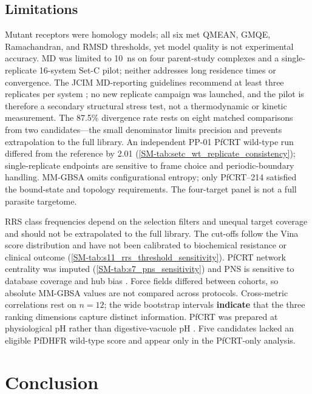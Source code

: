 \documentclass[journal=jcisd8,manuscript=article,layout=traditional]{achemso}
\begin{document}
\subsection{Limitations}

Mutant receptors were homology models; all six met QMEAN, GMQE, Ramachandran, and RMSD thresholds, yet model quality is not experimental accuracy. MD was limited to 10~ns on four parent-study complexes and a single-replicate 16-system Set-C pilot; neither addresses long residence times or convergence. The JCIM MD-reporting guidelines recommend at least three replicates per system \citep{soares2023mdreport}; no new replicate campaign was launched, and the pilot is therefore a secondary structural stress test, not a thermodynamic or kinetic measurement. The 87.5\% divergence rate rests on eight matched comparisons from two candidates---the small denominator limits precision and prevents extrapolation to the full library. An independent PP-01 PfCRT wild-type run differed from the reference by \qty{2.01}{\kcalmol} (\cref{SM-tab:setc_wt_replicate_consistency}); single-replicate endpoints are sensitive to frame choice and periodic-boundary handling. MM-GBSA omits configurational entropy; only PfCRT--214 satisfied the bound-state and topology requirements. The four-target panel is not a full parasite targetome.

RRS class frequencies depend on the selection filters and unequal target coverage and should not be extrapolated to the full library. The cut-offs follow the Vina score distribution and have not been calibrated to biochemical resistance or clinical outcome (\cref{SM-tab:s11_rrs_threshold_sensitivity}). PfCRT network centrality was imputed (\cref{SM-tab:s7_pns_sensitivity}) and PNS is sensitive to database coverage and hub bias \citep{panossian2025pitfalls}. Force fields differed between cohorts, so absolute MM-GBSA values are not compared across protocols. Cross-metric correlations rest on $n=12$; the wide bootstrap intervals \textbf{indicate} that the three ranking dimensions capture distinct information. PfCRT was prepared at physiological pH rather than digestive-vacuole pH \citep{temgoua2026chemrxiv}. Five candidates lacked an eligible PfDHFR wild-type score and appear only in the PfCRT-only analysis.


\section{Conclusion}
\end{document}
